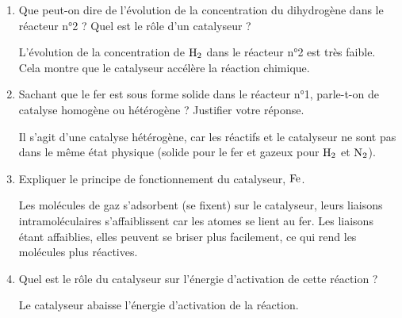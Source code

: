 \documentclass[12pt,a4paper]{article}
\newcommand{\correction}[1]{\textcolor{correction}{#1}}
\begin{document}
\begin{enumerate}
    \item Que peut-on dire de l'évolution de la concentration du dihydrogène dans le réacteur n°2 ? Quel est le rôle d'un catalyseur ?

    \correction{
        L'évolution de la concentration de $\ce{H2}$ dans le réacteur n°2 est très faible. Cela montre que le catalyseur accélère la réaction chimique.
    }

    \item Sachant que le fer est sous forme solide dans le réacteur n°1, parle-t-on de catalyse homogène ou hétérogène ? Justifier votre réponse.

    \correction{
        Il s'agit d'une catalyse hétérogène, car les réactifs et le catalyseur ne sont pas dans le même état physique (solide pour le fer et gazeux pour $\ce{H2}$ et $\ce{N2}$).
    }

    \item Expliquer le principe de fonctionnement du catalyseur, $\ce{Fe}$.

    \correction{
        Les molécules de gaz s'adsorbent (se fixent) sur le catalyseur, leurs liaisons intramoléculaires s'affaiblissent car les atomes se lient au fer. Les liaisons étant affaiblies, elles peuvent se briser plus facilement, ce qui rend les molécules plus réactives.
    }

    \item Quel est le rôle du catalyseur sur l'énergie d'activation de cette réaction ?

    \correction{
        Le catalyseur abaisse l'énergie d'activation de la réaction.
    }
\end{enumerate}
\end{document}
